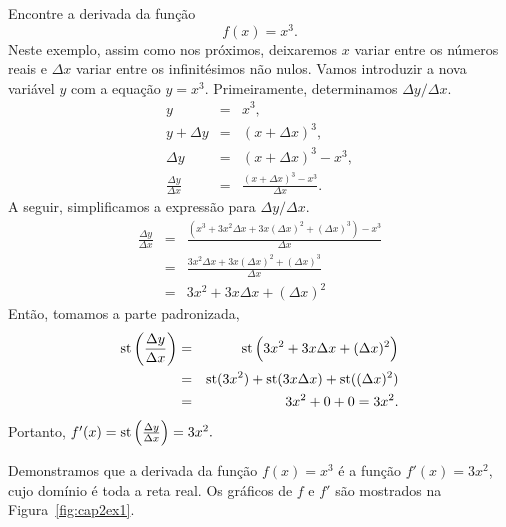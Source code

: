 \begin{example}
Encontre a derivada da função
$$
  f(x) = x^3.
$$
Neste exemplo, assim como nos próximos, deixaremos $x$ variar entre os números
reais e $\Delta{x}$ variar entre os infinitésimos não nulos. Vamos introduzir
a nova variável $y$ com a equação $y=x^3$. Primeiramente, determinamos
$\Delta{y}/\Delta{x}$.
\begin{eqnarray*}
  y           & = & x^3, \\
  y+\Delta{y} & = & (x+\Delta{x})^3, \\
  \Delta{y}   & = & (x+\Delta{x})^3 - x^3, \\
  \frac{\Delta{y}}{\Delta{x}} & = &
    \frac{(x+\Delta{x})^3 - x^3}{\Delta{x}}.
\end{eqnarray*}
A seguir, simplificamos a expressão para $\Delta{y}/\Delta{x}$.
\begin{eqnarray*}
  \frac{\Delta{y}}{\Delta{x}} & = &
    \frac{(x^3+3x^2\Delta{x}+3x(\Delta{x})^2+(\Delta{x})^3)-x^3}
         {\Delta{x}} \\
  & = &
    \frac{3x^2\Delta{x}+3x(\Delta{x})^2+(\Delta{x})^3}
         {\Delta{x}} \\
  & = &
    3x^2+3x\Delta{x}+(\Delta{x})^2
\end{eqnarray*}
Então, tomamos a parte padronizada,
\begin{eqnarray*}
  \operatorname{st}\left(\frac{\Delta{y}}{\Delta{x}}\right) & = &
    \operatorname{st}\left(3x^2+3x\Delta{x}+(\Delta{x})^2\right) \\
  & = &
    \operatorname{st}(3x^2)+\operatorname{st}(3x\Delta{x})+\operatorname{st}((\Delta{x})^2) \\
  & = & 3x^2 + 0 + 0 = 3x^2.
\end{eqnarray*}
Portanto, $f'(x) = \operatorname{st}\left(\frac{\Delta{y}}{\Delta{x}}\right) = 3x^2.$
\end{example}

Demonstramos que a derivada da função $f(x) = x^3$ é a função $f'(x) = 3x^2$,
cujo domínio é toda a reta real. Os gráficos de $f$ e $f'$ são mostrados na
Figura~\ref{fig:cap2ex1}.


